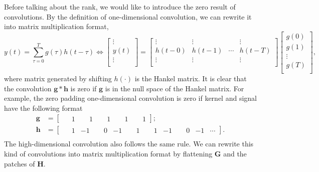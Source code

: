 \documentclass[twoside,11pt]{article}
\def\tvar#1{\mathbf{#1}} %
\begin{document}
  Before talking about the rank, we would like to introduce the zero result of convolutions.
  By the definition of one-dimensional convolution, we can rewrite it into matrix multiplication format,
  \begin{equation*}
    y(t) = \sum_{\tau=0}^{T} g(\tau) h(t - \tau)
    \Leftrightarrow
    \begin{bmatrix}
      \vdots \\
      y(t)   \\
      \vdots \\
    \end{bmatrix}
    = \begin{bmatrix}
      \vdots & \vdots &        & \vdots \\
      h(t-0) & h(t-1) & \cdots & h(t-T) \\
      \vdots & \vdots &        & \vdots \\
    \end{bmatrix}
    \begin{bmatrix}
      g(0)   \\
      g(1)   \\
      \vdots \\
      g(T)   \\
    \end{bmatrix},
  \end{equation*}
  where matrix generated by shifting \(h(\cdot)\) is the Hankel matrix.
  It is clear that the convolution \(\tvar{g} * \tvar{h}\) is zero if \(\tvar{g}\) is in the null space \citep{Horn1985} of the Hankel matrix.
  For example, the zero padding one-dimensional convolution is zero if kernel and signal have the following format
  \begin{equation*}
    \begin{aligned}
      \tvar{g} & = \begin{bmatrix} \phantom{-}1 & \phantom{-}1 & \phantom{-}1 & \phantom{-}1 & \phantom{-}1 \end{bmatrix}; \\
      \tvar{h} & = \begin{bmatrix} \phantom{-}1 & -1 & \phantom{-}0 & -1 & \phantom{-}1 & \phantom{-}1 & -1 & \phantom{-}0 & -1 & \cdots \end{bmatrix}. \\
    \end{aligned}
  \end{equation*}
  The high-dimensional convolution also follows the same rule.
  We can rewrite this kind of convolutions into matrix multiplication format by flattening \(\tvar{G}\) and the patches of \(\tvar{H}\).
\end{document}
